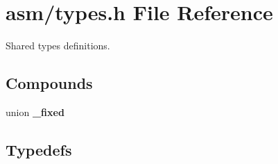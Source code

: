 \section{asm/types.h File Reference}
\label{asm/types.h}
Shared types definitions. 


\subsection*{Compounds}
\begin{CompactItemize}
\item 
union {\bf \_\-fixed}
\end{CompactItemize}
\subsection*{Typedefs}
